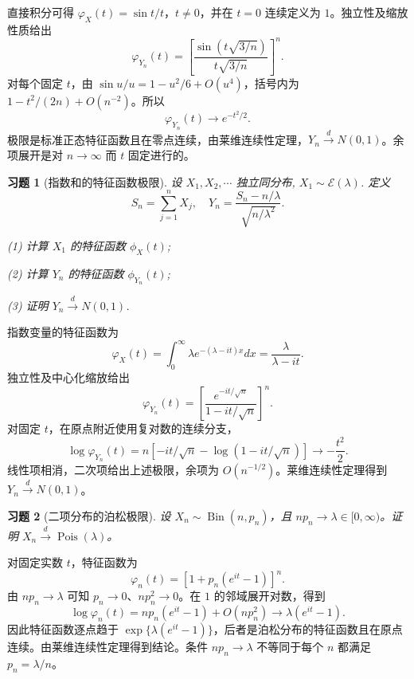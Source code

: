 \documentclass[UTF8,12pt,a4paper,fontset=fandol]{ctexart}
\newtheorem{exercise}{习题}[section]
\begin{document}
\begin{solve}\label{a:A6.29}直接积分可得 $\varphi_X(t)=\sin t/t$，$t\ne0$，并在 $t=0$ 连续定义为 $1$。独立性及缩放性质给出\[\varphi_{Y_n}(t)=\left[\frac{\sin(t\sqrt{3/n})}{t\sqrt{3/n}}\right]^n.\]对每个固定 $t$，由 $\sin u/u=1-u^2/6+O(u^4)$，括号内为 $1-t^2/(2n)+O(n^{-2})$。所以\[\varphi_{Y_n}(t)\to e^{-t^2/2}.\]极限是标准正态特征函数且在零点连续，由莱维连续性定理，$Y_n\xrightarrow dN(0,1)$。余项展开是对 $n\to\infty$ 而 $t$ 固定进行的。\end{solve}

\begin{exercise}[指数和的特征函数极限]\label{q:A6.30}
设 $X_1,X_2,\cdots$ 独立同分布, $X_1\sim\mathcal{E}(\lambda)$. 定义
    \[S_n=\sum\limits_{j=1}^nX_j,\quad Y_n=\dfrac{S_n-n/\lambda}{\sqrt{n/\lambda^2}}.\]

    (1) 计算 $X_1$ 的特征函数 $\phi_X(t)$;

    (2) 计算 $Y_n$ 的特征函数 $\phi_{Y_n}(t)$;

    (3) 证明 $Y_n\xrightarrow{d}N(0,1)$.\par{}
\end{exercise}

\begin{solve}\label{a:A6.30}指数变量的特征函数为\[\varphi_X(t)=\int_0^\infty\lambda e^{-(\lambda-it)x}dx=\frac{\lambda}{\lambda-it}.\]独立性及中心化缩放给出\[\varphi_{Y_n}(t)=\left[\frac{e^{-it/\sqrt n}}{1-it/\sqrt n}\right]^n.\]对固定 $t$，在原点附近使用复对数的连续分支，\[\log\varphi_{Y_n}(t)=n[-it/\sqrt n-\log(1-it/\sqrt n)]\to-\frac{t^2}2.\]线性项相消，二次项给出上述极限，余项为 $O(n^{-1/2})$。莱维连续性定理得到 $Y_n\xrightarrow dN(0,1)$。\end{solve}

\begin{exercise}[二项分布的泊松极限]\label{q:A6.34}
设 $X_n\sim\operatorname{Bin}(n,p_n)$，且 $np_n\to\lambda\in[0,\infty)$。证明 $X_n\xrightarrow{d}\operatorname{Pois}(\lambda)$。\par{}
\end{exercise}

\begin{solve}\label{a:A6.34}对固定实数 $t$，特征函数为\[\varphi_n(t)=[1+p_n(e^{it}-1)]^n.\]由 $np_n\to\lambda$ 可知 $p_n\to0$、$np_n^2\to0$。在 $1$ 的邻域展开对数，得到\[\log\varphi_n(t)=np_n(e^{it}-1)+O(np_n^2)\to\lambda(e^{it}-1).\]因此特征函数逐点趋于 $\exp\{\lambda(e^{it}-1)\}$，后者是泊松分布的特征函数且在原点连续。由莱维连续性定理得到结论。条件 $np_n\to\lambda$ 不等同于每个 $n$ 都满足 $p_n=\lambda/n$。\end{solve}
\end{document}
